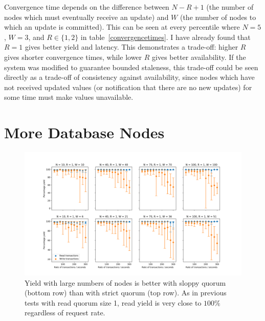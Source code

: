 \documentclass[12pt,a4paper,twoside,openany]{report}
\begin{document}
Convergence time depends on the difference between $N - R + 1$ (the number of nodes which must eventually receive an update) and $W$ (the number of nodes to which an update is committed). This can be seen at every percentile where $N = 5$, $W = 3$, and $R \in \{1, 2\}$ in table~\ref{convergencetimes}. I have already found that $R = 1$ gives better yield and latency. This demonstrates a trade-off: higher $R$ gives shorter convergence times, while lower $R$ gives better availability. If the system was modified to guarantee bounded staleness, this trade-off could be seen directly as a trade-off of consistency against availability, since nodes which have not received updated values (or notification that there are no new updates) for some time must make values unavailable.



\section{More Database Nodes}

\begin{figure}[ht]
\centerline{\includegraphics[width=\paperwidth]{figs/big-n-yield.png}}
\caption{Yield with large numbers of nodes is better with sloppy quorum (bottom row) than with strict quorum (top row). As in previous tests with read quorum size 1, read yield is very close to $100\%$ regardless of request rate.}
\label{big-n-yield}
\end{figure}
\end{document}
